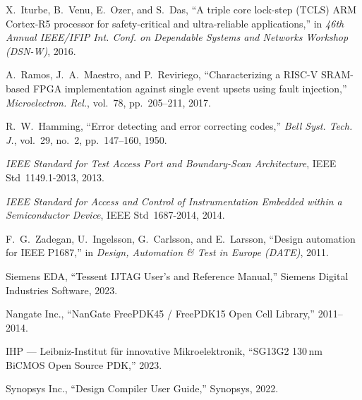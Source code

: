 X.~Iturbe, B.~Venu, E.~Ozer, and S.~Das,
``A triple core lock-step (TCLS) ARM Cortex-R5 processor for safety-critical and
ultra-reliable applications,'' in \emph{46th Annual IEEE/IFIP Int. Conf. on
Dependable Systems and Networks Workshop (DSN-W)}, 2016.

A.~Ramos, J.~A.~Maestro, and P.~Reviriego,
``Characterizing a RISC-V SRAM-based FPGA implementation against single event
upsets using fault injection,''
\emph{Microelectron. Rel.}, vol.~78, pp.~205--211, 2017.

R.~W.~Hamming,
``Error detecting and error correcting codes,''
\emph{Bell Syst. Tech. J.}, vol.~29, no.~2, pp.~147--160, 1950.

\emph{IEEE Standard for Test Access Port and Boundary-Scan Architecture},
IEEE Std~1149.1-2013, 2013.

\emph{IEEE Standard for Access and Control of Instrumentation Embedded within a
Semiconductor Device}, IEEE Std~1687-2014, 2014.

F.~G.~Zadegan, U.~Ingelsson, G.~Carlsson, and E.~Larsson,
``Design automation for IEEE P1687,'' in \emph{Design, Automation \& Test in
Europe (DATE)}, 2011.

Siemens EDA,
``Tessent IJTAG User's and Reference Manual,'' Siemens Digital Industries
Software, 2023.

Nangate Inc.,
``NanGate FreePDK45 / FreePDK15 Open Cell Library,'' 2011--2014.

IHP --- Leibniz-Institut f\"ur innovative Mikroelektronik,
``SG13G2 130\,nm BiCMOS Open Source PDK,'' 2023.

Synopsys Inc.,
``Design Compiler User Guide,'' Synopsys, 2022.
